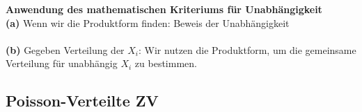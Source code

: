 \begin{bem}
    \textbf{Anwendung des mathematischen Kriteriums für Unabhängigkeit}   \\
    \textbf{(a)} Wenn wir die Produktform finden: Beweis der Unabhängigkeit
     \\
     \\
    \textbf{(b)} Gegeben
    Verteilung der $X_i$: Wir nutzen die Produktform, um die gemeinsame Verteilung für unabhängig $X_i$
    zu bestimmen.
\end{bem}

\subsection{Poisson-Verteilte ZV}\label{subsec:poisson-verteilte-zv}



